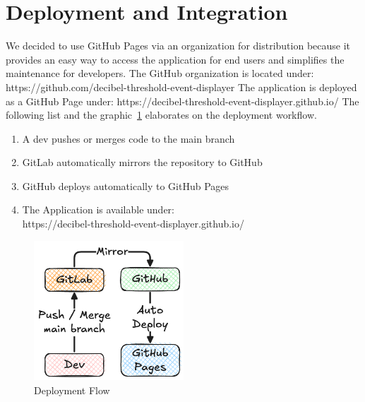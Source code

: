 \section{Deployment and Integration}\label{sec:deployment-and-integration}
We decided to use GitHub Pages via an organization for distribution because it provides an easy way to access the
application for end users and simplifies the maintenance for developers.
The GitHub organization is located under: https://github.com/decibel-threshold-event-displayer
The application is deployed as a GitHub Page under: https://decibel-threshold-event-displayer.github.io/
The following list and the graphic~\ref{fig:deployment_flow} elaborates on the deployment workflow.

\begin{enumerate}
    \item A dev pushes or merges code to the main branch
    \item GitLab automatically mirrors the repository to GitHub
    \item GitHub deploys automatically to GitHub Pages
    \item {The Application is available under: \\
          https://decibel-threshold-event-displayer.github.io/}
\end{enumerate}

\begin{figure}[H]
    \centering
    \includegraphics[width=0.5\textwidth]{../assets/deployment_and_distribution.png}
    \caption{Deployment Flow}\label{fig:deployment_flow}
\end{figure}

